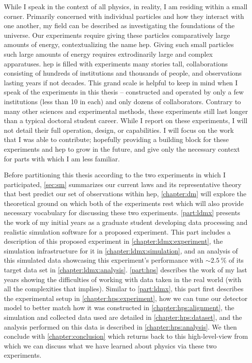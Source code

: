 While I speak in the context of all physics, in reality, I am residing within a small corner.
Primarily concerned with individual particles and how they interact with one another, my field can
be described as investigating the foundations of the universe. Our experiments require giving these
particles comparatively large amounts of energy, contextualizing the name \ac{hep}. Giving such
small particles such large amounts of energy requires extrodinarily large and complex apparatuses.
\ac{hep} is filled with experiments many stories tall, collaborations consisting of hundreds of
institutions and thousands of people, and observations lasting years if not decades. This grand
scale is helpful to keep in mind when I speak of the experiments in this thesis -- constructed and
operated by only a few institutions (less than 10 in each) and only dozens of collaborators.
Contrary to many other sciences and experimental methods, these experiments still last longer than
a typical doctoral student career. While I report on these experiments, I will not detail their
full operation, design, or capabilities. I will focus on the work that I was able to contribute;
hopefully providing a building block for these experiments and \ac{hep} to grow in the future, and
give only the necessary context for parts with which I am less familiar.

Before partitioning this thesis according to the two experiments in which I participated,
\cref{sec:sm} summarizes our current laws and its representative theory that best predict our set
of observations within \ac{hep}, \cref{chapter:dm} will explore the theoretical ground on which
both of the experiments rest which will also provide necessary vocabulary for discussing these two
experiments. \cref{part:ldmx} presents the work of my initial years as a graduate student
developing data processing and realistic simulation software for a proposed experiment. This part
includes a description of this proposed experiment in \cref{chapter:ldmx:experiment}, the
simulation infrastructure for it in \cref{chapter:ldmx:simulation}, and an analysis of this
simulated data showcasing this experiment's performance with $\sim\qty{2.5}{\%}$ of its target
data set in \cref{chapter:ldmx:analysis}. \cref{part:hps} describes the work of my last years showing
the difficulties of working with data taken in the real world (with all the complexities that
implies). Similar to \cref{part:ldmx}, this part first describes the experimental setup in
\cref{chapter:hps:experiment}, how we can tune our detector model to better match how it was
constructed in \cref{chapter:hps:alignment}, the simulation and collected data used are detailed in
\cref{chapter:hps:dataset}, and the analysis performed on this data is described in
\cref{chapter:hps:analysis}. We then conclude with \cref{chapter:conclusion} which returns back to
this high-level-view from which we can discuss what we have learned about physics via these two
experiments.

